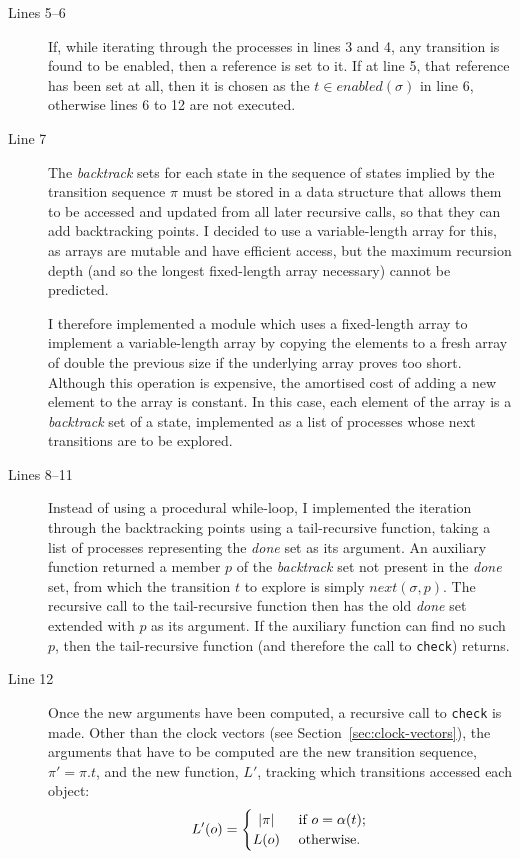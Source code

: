 \documentclass[12pt,a4paper,twoside,openright]{report}
\begin{document}
\begin{description}
	\item[Lines 5--6] If, while iterating through the
	processes in lines 3 and 4, any transition is found to be
	enabled, then a reference is set to it. If at line 5,
	that reference has been set at all, then it is chosen
	as the $t \in \textit{enabled}(\sigma)$ in line 6,
	otherwise lines 6 to 12 are not executed.

	\item[Line 7] The \textit{backtrack} sets for each state
	in the sequence of states implied by the transition
	sequence $\pi$ must be stored in a data structure that
	allows them to be accessed and updated from all later
	recursive calls, so that they can add backtracking
	points. I decided to use a variable-length array
	for this, as arrays are mutable and have efficient
	access, but the maximum recursion depth (and so the
	longest fixed-length array necessary) cannot be predicted.
	
	I therefore implemented a module which uses a fixed-length
	array to implement a variable-length array by
	copying the elements to a fresh array of double the
	previous size if the underlying array proves too short.
	Although this operation is expensive, the amortised
	cost of adding a new element to the array is constant.
	In this case, each element of the array is a \textit{backtrack}
	set of a state, implemented as a list of processes
	whose next transitions are to be explored.
	
	\item[Lines 8--11] Instead of using a
	procedural while-loop,
	I implemented the iteration through
	the backtracking points
	using a tail-recursive
	function, taking a list of processes
	representing the \textit{done} set as
	its argument. An auxiliary
	function returned a member $p$ of the
	\textit{backtrack} set not present in the
	\textit{done} set, from which the
	transition $t$ to explore is simply
	$\textit{next}(\sigma, p)$. The
	recursive call to the tail-recursive function
	then has the old \textit{done} set
	extended with $p$ as its argument. If
	the auxiliary function can
	find no such $p$, then the
	tail-recursive function (and therefore the
	call to \texttt{check}) returns.

	\item[Line 12] Once the new arguments have
	been computed, a recursive call to
	\texttt{check} is made. Other than
	the clock vectors (see Section~\ref{sec:clock-vectors}),
	the arguments that
	have to be computed are the new transition
	sequence, $\pi' = \pi.t$,
	and the new function, $L'$,
	tracking which transitions accessed each 
	object:
	\[ L'(o) =
	\begin{cases}
		\hfill |\pi| \hfill & \text{ if } o = \alpha(t); \\
		\hfill L(o) \hfill & \text{ otherwise}.
	\end{cases}\]


\end{description}
\end{document}
